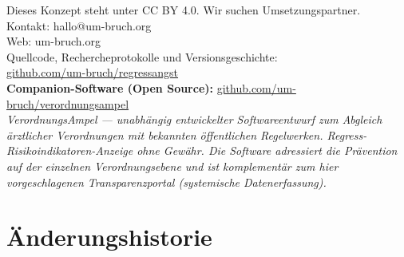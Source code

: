\documentclass{umbruch-position}
\begin{document}
\vspace{1cm}
\begin{center}
Dieses Konzept steht unter CC BY 4.0. Wir suchen Umsetzungspartner.\\[1em]
Kontakt: hallo@um-bruch.org \\
Web: um-bruch.org\\[0.5em]
Quellcode, Rechercheprotokolle und Versionsgeschichte:\\
\href{https://github.com/um-bruch/regressangst}{github.com/um-bruch/regressangst}\\[0.5em]
\textbf{Companion-Software (Open Source):} \href{https://github.com/um-bruch/verordnungsampel}{github.com/um-bruch/verordnungsampel}\\
\textit{VerordnungsAmpel --- unabh\"angig entwickelter Softwareentwurf zum Abgleich \"arztlicher Verordnungen mit bekannten \"offentlichen Regelwerken. Regress-Risikoindikatoren-Anzeige ohne Gew\"ahr. Die Software adressiert die Pr\"avention auf der einzelnen Verordnungsebene und ist komplement\"ar zum hier vorgeschlagenen Transparenzportal (systemische Datenerfassung).}
\end{center}

\newpage
\section*{Änderungshistorie}
\end{document}
